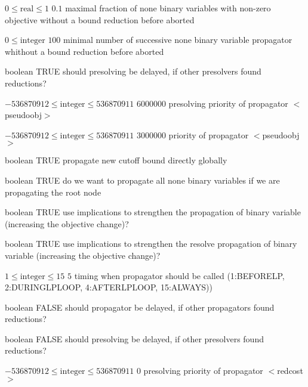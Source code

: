 %
{$0\leq\textrm{real}\leq1$}%
{$0.1$}%
{maximal fraction of none binary variables with non-zero objective without a bound reduction before aborted}%
{}

%
{$0\leq\textrm{integer}$}%
{$100$}%
{minimal number of successive none binary variable propagator whithout a bound reduction before aborted}%
{}

%
{boolean}%
{TRUE}%
{should presolving be delayed, if other presolvers found reductions?}%
{}

%
{$-536870912\leq\textrm{integer}\leq536870911$}%
{$6000000$}%
{presolving priority of propagator $<$pseudoobj$>$}%
{}

%
{$-536870912\leq\textrm{integer}\leq536870911$}%
{$3000000$}%
{priority of propagator $<$pseudoobj$>$}%
{}

%
{boolean}%
{TRUE}%
{propagate new cutoff bound directly globally}%
{}

%
{boolean}%
{TRUE}%
{do we want to propagate all none binary variables if we are propagating the root node}%
{}

%
{boolean}%
{TRUE}%
{use implications to strengthen the propagation of binary variable (increasing the objective change)?}%
{}

%
{boolean}%
{TRUE}%
{use implications to strengthen the resolve propagation of binary variable (increasing the objective change)?}%
{}

%
{$1\leq\textrm{integer}\leq15$}%
{$5$}%
{timing when propagator should be called (1:BEFORELP, 2:DURINGLPLOOP, 4:AFTERLPLOOP, 15:ALWAYS))}%
{}

%
{boolean}%
{FALSE}%
{should propagator be delayed, if other propagators found reductions?}%
{}

%
{boolean}%
{FALSE}%
{should presolving be delayed, if other presolvers found reductions?}%
{}

%
{$-536870912\leq\textrm{integer}\leq536870911$}%
{$0$}%
{presolving priority of propagator $<$redcost$>$}%
{}

